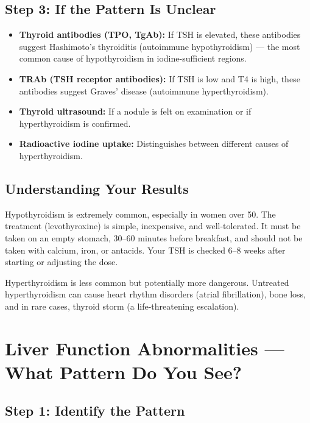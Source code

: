 \subsection{Step 3: If the Pattern Is Unclear}

\begin{itemize}
    \item \textbf{Thyroid antibodies (TPO, TgAb):} If TSH is elevated, these antibodies suggest Hashimoto's thyroiditis (autoimmune hypothyroidism) --- the most common cause of hypothyroidism in iodine-sufficient regions.
    \item \textbf{TRAb (TSH receptor antibodies):} If TSH is low and T4 is high, these antibodies suggest Graves' disease (autoimmune hyperthyroidism).
    \item \textbf{Thyroid ultrasound:} If a nodule is felt on examination or if hyperthyroidism is confirmed.
    \item \textbf{Radioactive iodine uptake:} Distinguishes between different causes of hyperthyroidism.
\end{itemize}

\subsection{Understanding Your Results}

Hypothyroidism is extremely common, especially in women over 50. The treatment (levothyroxine) is simple, inexpensive, and well-tolerated. It must be taken on an empty stomach, 30--60 minutes before breakfast, and should not be taken with calcium, iron, or antacids. Your TSH is checked 6--8 weeks after starting or adjusting the dose.

Hyperthyroidism is less common but potentially more dangerous. Untreated hyperthyroidism can cause heart rhythm disorders (atrial fibrillation), bone loss, and in rare cases, thyroid storm (a life-threatening escalation).

\clearpage
\section{Liver Function Abnormalities --- What Pattern Do You See?}

\subsection{Step 1: Identify the Pattern}

